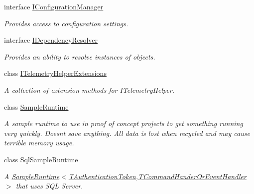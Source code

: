 \begin{DoxyCompactItemize}
interface \hyperlink{interfaceCqrs_1_1Configuration_1_1IConfigurationManager}{I\+Configuration\+Manager}
\begin{DoxyCompactList}\small\item\em Provides access to configuration settings. \end{DoxyCompactList}\item 
interface \hyperlink{interfaceCqrs_1_1Configuration_1_1IDependencyResolver}{I\+Dependency\+Resolver}
\begin{DoxyCompactList}\small\item\em Provides an ability to resolve instances of objects. \end{DoxyCompactList}\item 
class \hyperlink{classCqrs_1_1Configuration_1_1ITelemetryHelperExtensions}{I\+Telemetry\+Helper\+Extensions}
\begin{DoxyCompactList}\small\item\em A collection of extension methods for I\+Telemetry\+Helper. \end{DoxyCompactList}\item 
class \hyperlink{classCqrs_1_1Configuration_1_1SampleRuntime}{Sample\+Runtime}
\begin{DoxyCompactList}\small\item\em A sample runtime to use in proof of concept projects to get something running very quickly. Doesn\textquotesingle{}t save anything. All data is lost when recycled and may cause terrible memory usage. \end{DoxyCompactList}\item 
class \hyperlink{classCqrs_1_1Configuration_1_1SqlSampleRuntime}{Sql\+Sample\+Runtime}
\begin{DoxyCompactList}\small\item\em A \hyperlink{classCqrs_1_1Configuration_1_1SampleRuntime_a9382e8b20b8701815ad20c1cd645c27b_a9382e8b20b8701815ad20c1cd645c27b}{Sample\+Runtime$<$\+T\+Authentication\+Token,\+T\+Command\+Hander\+Or\+Event\+Handler$>$} that uses S\+QL Server. \end{DoxyCompactList}\end{DoxyCompactItemize}
